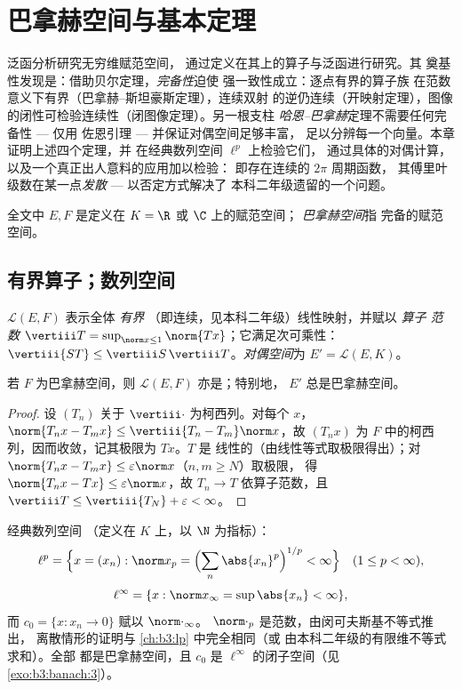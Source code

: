 \chapter{巴拿赫空间与基本定理}
\label{ch:b3:banach}

泛函分析研究无穷维赋范空间，
通过定义在其上的算子与泛函进行研究。其
奠基性发现是：借助贝尔定理，\emph{完备性}迫使
强一致性成立：逐点有界的算子族
在范数意义下有界（巴拿赫–斯坦豪斯定理），连续双射
的逆仍连续（开映射定理），图像
的闭性可检验连续性（闭图像定理）。另一根支柱
\emph{哈恩–巴拿赫}定理不需要任何完备性 --- 仅用
佐恩引理 --- 并保证对偶空间足够丰富，
足以分辨每一个向量。本章证明上述四个定理，并
在经典数列空间 $\ell^p$ 上检验它们，
通过具体的对偶计算，以及一个真正出人意料的应用加以检验：
即存在连续的 $2\pi$ 周期函数，
其傅里叶级数在某一点\emph{发散} --- 以否定方式解决了
本科二年级遗留的一个问题。

全文中 $E, F$ 是定义在 $K = \R$ 或 $\C$ 上的赋范空间；
\emph{巴拿赫空间}指
完备的赋范空间。

\section{有界算子；数列空间}

\begin{definition}\label{def:b3:banach:operator}
$\mathcal L(E, F)$ 表示全体 \emph{有界}
（即连续，见本科二年级）线性映射，并赋以 \emph{算子
范数} $\vertiii T = \sup_{\norm x \leq
1}\norm{Tx}$；它满足次可乘性：$\vertiii{ST} \leq
\vertiii S\,\vertiii T$。\emph{对偶空间}为
$E' = \mathcal L(E, K)$。
\end{definition}

\begin{proposition}\label{prop:b3:banach:llcomplete}
若 $F$ 为巴拿赫空间，则 $\mathcal L(E, F)$ 亦是；特别地，
$E'$ 总是巴拿赫空间。
\end{proposition}

\begin{proof}
设 $(T_n)$ 关于 $\vertiii\cdot$ 为柯西列。对每个 $x$，
$\norm{T_nx - T_mx} \leq \vertiii{T_n - T_m}\norm x$，故 $(T_nx)$
为 $F$ 中的柯西列，因而收敛，记其极限为 $Tx$。$T$ 是
线性的（由线性等式取极限得出）；对
$\norm{T_nx - T_mx} \leq \varepsilon\norm x$（$n, m \geq N$）取极限，
得 $\norm{T_nx - Tx} \leq \varepsilon\norm x$，故 $T_n \to T$
依算子范数，且 $\vertiii T \leq \vertiii{T_N} +
\varepsilon < \infty$。
\end{proof}

\begin{definition}\label{def:b3:banach:lp}
经典数列空间
（定义在 $K$ 上，以 $\N$ 为指标）：
\[
\ell^p = \Bigl\{x = (x_n) : \norm x_p = \Bigl(\sum_n
\abs{x_n}^p\Bigr)^{1/p} < \infty\Bigr\}\quad (1 \leq p <
\infty),
\]
\[
\ell^\infty = \{x : \norm x_\infty = \sup\abs{x_n} < \infty\},
\]
而 $c_0 = \{x : x_n \to 0\}$ 赋以 $\norm\cdot_\infty$。
$\norm\cdot_p$ 是范数，由闵可夫斯基不等式推出，
离散情形的证明与 \cref{ch:b3:lp} 中完全相同（或
由本科二年级的有限维不等式求和）。全部
都是巴拿赫空间，且 $c_0$ 是
$\ell^\infty$ 的闭子空间（见 \cref{exo:b3:banach:3}）。
\end{definition}

